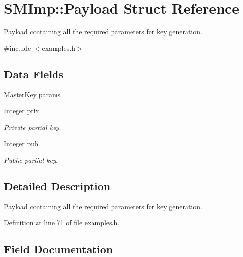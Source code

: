 \hypertarget{structSMImp_1_1Payload}{}\section{S\+M\+Imp\+:\+:Payload Struct Reference}
\label{structSMImp_1_1Payload}


\hyperlink{structSMImp_1_1Payload}{Payload} containing all the required parameters for key generation.  




{\ttfamily \#include $<$examples.\+h$>$}

\subsection*{Data Fields}
\begin{DoxyCompactItemize}
\item 
\hyperlink{structSMImp_1_1MasterKey}{Master\+Key} \hyperlink{structSMImp_1_1Payload_ab452d768490509f35be58c9f2cdb9b31}{params}
\item 
Integer \hyperlink{structSMImp_1_1Payload_ace83de4908d00be0927c1c5f60c5d15b}{priv}
\begin{DoxyCompactList}\small\item\em Private partial key. \end{DoxyCompactList}\item 
Integer \hyperlink{structSMImp_1_1Payload_a9e05bf883f696d21c610a13c2a495f1c}{pub}
\begin{DoxyCompactList}\small\item\em Public partial key. \end{DoxyCompactList}\end{DoxyCompactItemize}


\subsection{Detailed Description}
\hyperlink{structSMImp_1_1Payload}{Payload} containing all the required parameters for key generation. 

Definition at line 71 of file examples.\+h.



\subsection{Field Documentation}
\mbox{\label{structSMImp_1_1Payload_ab452d768490509f35be58c9f2cdb9b31}} 
